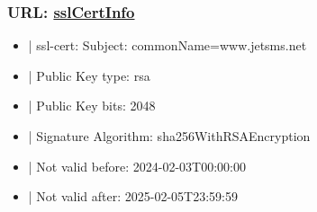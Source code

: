 \documentclass{article}
\begin{document}
\subsubsection{URL: \url{sslCertInfo}}
\begin{itemize}
\item | ssl-cert: Subject: commonName=www.jetsms.net
\item | Public Key type: rsa
\item | Public Key bits: 2048
\item | Signature Algorithm: sha256WithRSAEncryption
\item | Not valid before: 2024-02-03T00:00:00
\item | Not valid after:  2025-02-05T23:59:59
\end{itemize}
\end{document}
